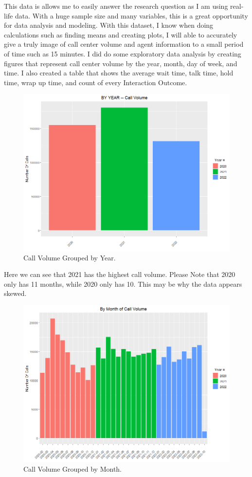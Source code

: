 \documentclass[12pt]{article}
\begin{document}
  This data is allows me to easily answer the research question as I am using real-life data. With a huge sample size and many variables,
this is a great opportunity for data analysis and modeling. With this dataset, I know when doing calculations such as finding means and creating plots, 
I will able to accurately give a truly image of call center volume and agent information to a small period of time such as 15 minutes.
  I did do some exploratory data analysis by creating figures that represent call center volume by the year, month, day of week, and time. 
I also created a table that shows the average wait time, talk time, hold time, wrap up time, and count of every Interaction Outcome.
\begin{figure}[H]
  \centering
  \includegraphics[width=\textwidth]{By Year.png}
  \caption{Call Volume Grouped by Year.}
  \label{fig:Year}
\end{figure}
Here we can see that 2021 has the highest call volume. Please Note that 2020 only has 11 months, while 2020 only has 10. This may be why the data appears skewed.
\begin{figure}[H]
  \centering
  \includegraphics[width=\textwidth]{ByMonthVolume.png}
  \caption{Call Volume Grouped by Month.}
  \label{fig:Month}
\end{figure}
\end{document}
